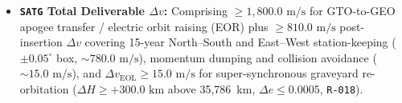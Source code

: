 \documentclass[11pt,a4paper]{article}
\providecommand{\abbr}[1]{#1}
\begin{document}
\begin{itemize}
\begin{itemize}
        \item \textbf{\texttt{SATG} Total Deliverable $\Delta v$:} Comprising $\ge 1{,}800.0\text{ m/s}$ for \abbr{GTO}-to-\abbr{GEO} apogee transfer / electric orbit raising (\abbr{EOR}) plus $\ge 810.0\text{ m/s}$ post-insertion $\Delta v$ covering 15-year North--South and East--West station-keeping ($\pm 0.05^\circ$ box, $\sim 780.0\text{ m/s}$), momentum dumping and collision avoidance ($\sim 15.0\text{ m/s}$), and $\Delta v_{\text{EOL}} \ge 15.0\text{ m/s}$ for super-synchronous graveyard re-orbitation ($\Delta H \ge +300.0\text{ km}$ above 35,786~km, $\Delta e \le 0.0005$, \texttt{R-018}).
    \end{itemize}
\end{itemize}
\end{document}

